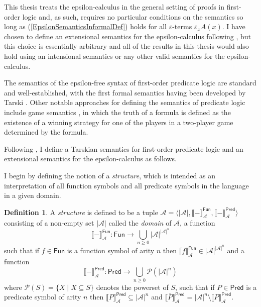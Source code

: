 \documentclass[10pt]{article}
\theoremstyle{definition}\newtheorem{remark}[theorem]{Remark}
\theoremstyle{definition}\newtheorem{example}[theorem]{Example}
\theoremstyle{definition}\newtheorem{definition}[theorem]{Definition}
\newcommand{\functionsSet}{\mathsf{Fun}}
\newcommand{\predicatesSet}{\mathsf{Pred}}
\begin{document}
	This thesis treats the epsilon-calculus in the general setting of proofs in first-order logic and, as such, requires no particular conditions on the semantics so long as (\ref{EpsilonSemanticsInformalDef}) holds for all $\varepsilon$-terms $\varepsilon_x A(x)$. I have chosen to define an extensional semantics for the epsilon-calculus following \cite{ZachEpsilonSemantics}, but this choice is essentially arbitrary and all of the results in this thesis would also hold using an intensional semantics or any other valid semantics for the epsilon-calculus.
	
	The semantics of the epsilon-free syntax of first-order predicate logic are standard and well-established, with the first formal semantics having been developed by Tarski \cite{TarskiConceptOfTruth}. Other notable approaches for defining the semantics of predicate logic include game semantics \cite{HintikkaPrinciplesMathematics, CoquandSemanticsOfEvidence}, in which the truth of a formula is defined as the existence of a winning strategy for one of the players in a two-player game determined by the formula.
	
	Following \cite{ZachEpsilonSemantics}, I define a Tarskian semantics for first-order predicate logic and an extensional semantics for the epsilon-calculus as follows.
	
	I begin by defining the notion of a \textit{structure}, which is intended as an interpretation of all function symbols and all predicate symbols in the language in a given domain.
	
	\begin{definition}
		A \textit{structure} is defined to be a tuple $\mathcal{A} = \langle | \mathcal{A} |, \llbracket - \rrbracket_\mathcal{A}^{\functionsSet}, \llbracket - \rrbracket_\mathcal{A}^{\predicatesSet} \rangle$ consisting of a non-empty set $| \mathcal{A} |$ called the \textit{domain} of $\mathcal{A}$, a function
		\[
			\llbracket - \rrbracket_\mathcal{A}^{\functionsSet}: \functionsSet \rightarrow \bigcup_{n \geq 0} | \mathcal{A} |^{| \mathcal{A} |^n}
		\]
		such that if $f \in \functionsSet$ is a function symbol of arity $n$ then $\llbracket f \rrbracket_\mathcal{A}^{\functionsSet} \in | \mathcal{A} |^{| \mathcal{A} |^n}$ and a function
		\[
			\llbracket - \rrbracket_\mathcal{A}^{\predicatesSet}: \predicatesSet \rightarrow \bigcup_{n \geq 0} \mathcal{P} (| \mathcal{A} |^n)
		\]
		where $\mathcal{P}(S) = \{X \mid X \subseteq S\}$ denotes the powerset of $S$, such that if $P \in \predicatesSet$ is a predicate symbol of arity $n$ then $\llbracket P \rrbracket_\mathcal{A}^{\predicatesSet} \subseteq | \mathcal{A} |^n$ and $\llbracket \overline{P} \rrbracket_\mathcal{A}^{\predicatesSet} = | \mathcal{A} |^n \setminus \llbracket P \rrbracket_\mathcal{A}^{\predicatesSet}$.
	\end{definition}
\end{document}
